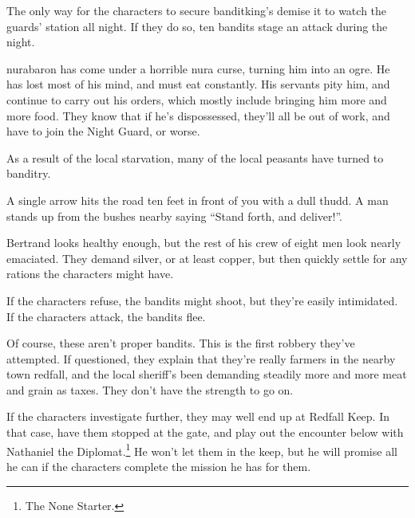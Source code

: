 \begin{multicols}{2}
The only way for the characters to secure \gls{banditking}'s demise it to watch the guards' station all night.
If they do so, ten bandits stage an attack during the night.


\humansoldier

\label{desperatemeasures}

\gls{nurabaron} has come under a horrible nura curse, turning him into an ogre.
He has lost most of his mind, and must eat constantly.
His servants pity him, and continue to carry out his orders, which mostly include bringing him more and more food.  They know that if he's dispossessed, they'll all be out of work, and have to join the Night Guard, or worse.

As a result of the local starvation, many of the local peasants have turned to banditry.


\begin{boxtext}

	A single arrow hits the road ten feet in front of you with a dull thudd.
	A man stands up from the bushes nearby saying ``Stand forth, and deliver!''.

\end{boxtext}

Bertrand looks healthy enough, but the rest of his crew of eight men look nearly emaciated.  They demand silver, or at least copper, but then quickly settle for any rations the characters might have.

If the characters refuse, the bandits might shoot, but they're easily intimidated.  If the characters attack, the bandits flee.

Of course, these aren't proper bandits.
This is the first robbery they've attempted.
If questioned, they explain that they're really farmers in the nearby town \gls{redfall}, and the local sheriff's been demanding steadily more and more meat and grain as taxes.
They don't have the strength to go on.

\humansoldier


If the characters investigate further, they may well end up at Redfall Keep.
In that case, have them stopped at the gate, and play out the encounter below with Nathaniel the Diplomat.\footnote{The None Starter.}
He won't let them in the keep, but he will promise all he can if the characters complete the mission he has for them.


\end{multicols}
